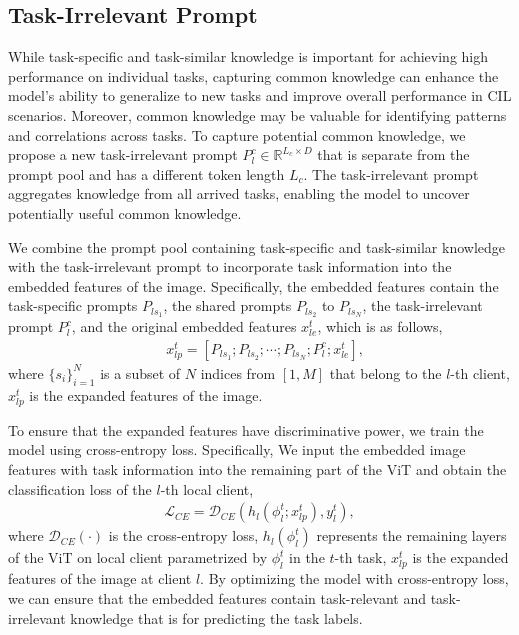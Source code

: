 \documentclass[sigconf,anonymous,review,screen]{acmart}
\begin{document}
\subsection{Task-Irrelevant Prompt}\label{Task-Irrelevant Prompt}
While task-specific and task-similar knowledge is important for achieving high performance on individual tasks, capturing common knowledge can enhance the model's ability to generalize to new tasks and improve overall performance in CIL scenarios. Moreover, common knowledge may be valuable for identifying patterns and correlations across tasks. To capture potential common knowledge, we propose a new task-irrelevant prompt $P_l^{c} \in \mathbb{R}^{L_c \times D}$ that is separate from the prompt pool and has a different token length $L_c$. The task-irrelevant prompt aggregates knowledge from all arrived tasks, enabling the model to uncover potentially useful common knowledge.

We combine the prompt pool containing task-specific and task-similar knowledge with the task-irrelevant prompt to incorporate task information into the embedded features of the image. Specifically, the embedded features contain the task-specific prompts $P_{ls_1}$, the shared prompts $P_{ls_2}$ to $P_{ls_N}$, the task-irrelevant prompt $P_l^c$, and the original embedded features $x_{le}^t$, which is as follows,
\begin{equation}\label{eqn-6}
	\begin{aligned}
		&x_{lp}^t = [P_{ls_1}; P_{ls_2}; \cdots; P_{ls_N}; P_l^c; x_{le}^t],
	\end{aligned}
\end{equation}
where $\{s_i\}_{i=1}^N$ is a subset of $N$ indices from $[1, M]$ that belong to the $l$-th client, $x_{lp}^t$ is the expanded features of the image. 

To ensure that the expanded features have discriminative power, we train the model using cross-entropy loss. Specifically, We input the embedded image features with task information into the remaining part of the ViT and obtain the classification loss of the $l$-th local client,
\begin{equation}\label{eqn-7}
	\begin{aligned}
		\mathcal{L}_{CE} = \mathcal{D}_{CE}(h_l(\phi_l^t;x_{lp}^t),y_l^t),
	\end{aligned}
\end{equation}
where $\mathcal{D}_{CE}(\cdot)$ is the cross-entropy loss, $h_l(\phi_l^t)$ represents the remaining layers of the ViT on local client parametrized by $\phi_l^t$ in the $t$-th task, $x_{lp}^t$ is the expanded features of the image at client $l$. By optimizing the model with cross-entropy loss, we can ensure that the embedded features contain task-relevant and task-irrelevant knowledge that is for predicting the task labels. 
\end{document}
